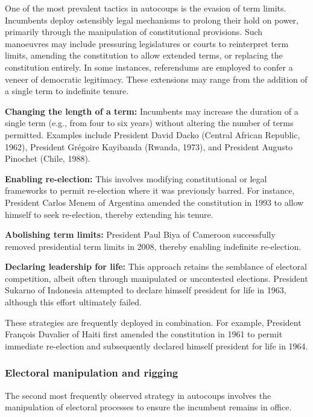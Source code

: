 \documentclass[
  12pt,
]{report}
\begin{document}
One of the most prevalent tactics in autocoups is the evasion of term
limits. Incumbents deploy ostensibly legal mechanisms to prolong their
hold on power, primarily through the manipulation of constitutional
provisions. Such manoeuvres may include pressuring legislatures or
courts to reinterpret term limits, amending the constitution to allow
extended terms, or replacing the constitution entirely. In some
instances, referendums are employed to confer a veneer of democratic
legitimacy. These extensions may range from the addition of a single
term to indefinite tenure.

\textbf{Changing the length of a term:} Incumbents may increase the
duration of a single term (e.g., from four to six years) without
altering the number of terms permitted. Examples include President David
Dacko (Central African Republic, 1962), President Grégoire Kayibanda
(Rwanda, 1973), and President Augusto Pinochet (Chile, 1988).

\textbf{Enabling re-election:} This involves modifying constitutional or
legal frameworks to permit re-election where it was previously barred.
For instance, President Carlos Menem of Argentina amended the
constitution in 1993 to allow himself to seek re-election, thereby
extending his tenure.

\textbf{Abolishing term limits:} President Paul Biya of Cameroon
successfully removed presidential term limits in 2008, thereby enabling
indefinite re-election.

\textbf{Declaring leadership for life:} This approach retains the
semblance of electoral competition, albeit often through manipulated or
uncontested elections. President Sukarno of Indonesia attempted to
declare himself president for life in 1963, although this effort
ultimately failed.

These strategies are frequently deployed in combination. For example,
President François Duvalier of Haiti first amended the constitution in
1961 to permit immediate re-election and subsequently declared himself
president for life in 1964.

\subsubsection*{Electoral manipulation and
rigging}\label{electoral-manipulation-and-rigging}

The second most frequently observed strategy in autocoups involves the
manipulation of electoral processes to ensure the incumbent remains in
office.
\end{document}
